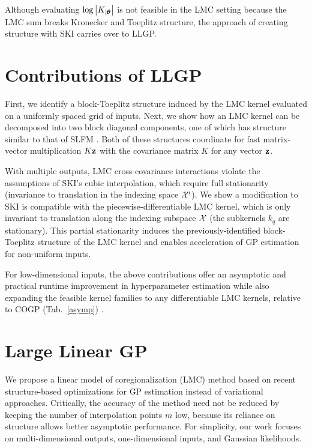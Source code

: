 \documentclass{article}
\begin{document}
Although evaluating $\log\left|K_{|{\boldsymbol\theta}}\right|$ is not feasible in the LMC setting because the LMC sum breaks Kronecker and Toeplitz structure, the approach of creating structure with SKI carries over to LLGP.

\section{Contributions of LLGP}\label{sec:contributions}

First, we identify a block-Toeplitz structure induced by the LMC kernel evaluated on a uniformly spaced grid of inputs. Next, we show how an LMC kernel can be decomposed into two block diagonal components, one of which has structure similar to that of SLFM \cite{seeger2005semiparametric}. Both of these structures coordinate for fast matrix-vector multiplication $K\textbf{z}$ with the covariance matrix $K$ for any vector $\textbf{z}$.

With multiple outputs, LMC cross-covariance interactions violate the assumptions of SKI's cubic interpolation, which require full stationarity (invariance to translation in the indexing space $\mathcal{X}'$). We show a modification to SKI is compatible with the piecewise-differentiable LMC kernel, which is only invariant to translation along the indexing subspace $\mathcal{X}$ (the subkernels $k_q$ are stationary). This partial stationarity induces the previously-identified block-Toeplitz structure of the LMC kernel and enables acceleration of GP estimation for non-uniform inputs.

For low-dimensional inputs, the above contributions offer an asymptotic and practical runtime improvement in hyperparameter estimation while also expanding the feasible kernel families to any differentiable LMC kernels, relative to COGP (Tab.~\ref{asymp}) \cite{nguyen2014collaborative}.

\section{Large Linear GP} \label{sec:matrix-free}

We propose a linear model of coregionalization (LMC) method based on recent structure-based optimizations for GP estimation instead of variational approaches. Critically, the accuracy of the method need not be reduced by keeping the number of interpolation points $m$ low, because its reliance on structure allows better asymptotic performance.
For simplicity, our work focuses on multi-dimensional outputs, one-dimensional inputs, and Gaussian likelihoods.
\end{document}
